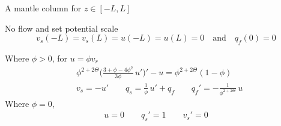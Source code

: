 \documentclass[usenames,dvipsnames,letterpaper,landscape,final]{slides}
\begin{document}
%
\begin{myslide}

A mantle column for $z\in[-L,L]$

 No flow and set potential scale
\begin{equation*}
v_s(-L) = v_s(L) = u(-L) = u(L) = 0
\quad\text{and}\quad
q_f(0) = 0
\end{equation*}

 Where $\phi>0$, for $u=\phi v_r$
\begin{align*}
&\phi^{2+2\Theta}\Big(\frac{3+\phi-4\phi^2}{3\phi}\,u'\Big)' - u = \phi^{2+2\Theta}(1 - \phi)\\
&v_s = -u'
\qquad q_s = \frac1{\phi}\,u' + q_f  
\qquad q_f' = -\frac1{\phi^{2+2\Theta}}\,u
\end{align*}
Where $\phi=0$, 
\begin{align*}
u=0
\qquad q_s'=1
\qquad v_s'=0
\end{align*}

\end{myslide}
%
%
\end{document}
